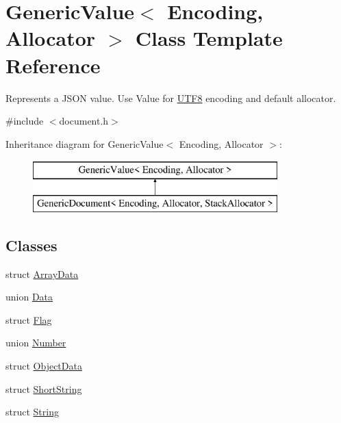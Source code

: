 \hypertarget{a00130}{}\section{Generic\+Value$<$ Encoding, Allocator $>$ Class Template Reference}
\label{a00130}


Represents a J\+S\+ON value. Use Value for \hyperlink{a00333}{U\+T\+F8} encoding and default allocator.  




{\ttfamily \#include $<$document.\+h$>$}

Inheritance diagram for Generic\+Value$<$ Encoding, Allocator $>$\+:\begin{figure}[H]
\begin{center}
\leavevmode
\includegraphics[height=2.000000cm]{a00130}
\end{center}
\end{figure}
\subsection*{Classes}
\begin{DoxyCompactItemize}
\item 
struct \hyperlink{a00037}{Array\+Data}
\item 
union \hyperlink{a00071}{Data}
\item 
struct \hyperlink{a00104}{Flag}
\item 
union \hyperlink{a00226}{Number}
\item 
struct \hyperlink{a00227}{Object\+Data}
\item 
struct \hyperlink{a00273}{Short\+String}
\item 
struct \hyperlink{a00291}{String}
\end{DoxyCompactItemize}
